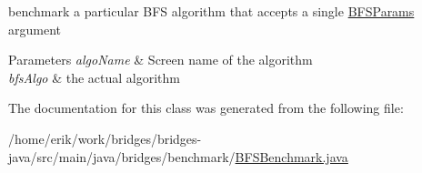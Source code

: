 benchmark a particular B\+FS algorithm that accepts a single \hyperlink{classbridges_1_1benchmark_1_1_b_f_s_params}{B\+F\+S\+Params} argument 


\begin{DoxyParams}{Parameters}
{\em algo\+Name} & Screen name of the algorithm \\
\hline
{\em bfs\+Algo} & the actual algorithm \\
\hline
\end{DoxyParams}


The documentation for this class was generated from the following file\+:\begin{DoxyCompactItemize}
\item 
/home/erik/work/bridges/bridges-\/java/src/main/java/bridges/benchmark/\hyperlink{_b_f_s_benchmark_8java}{B\+F\+S\+Benchmark.\+java}\end{DoxyCompactItemize}
